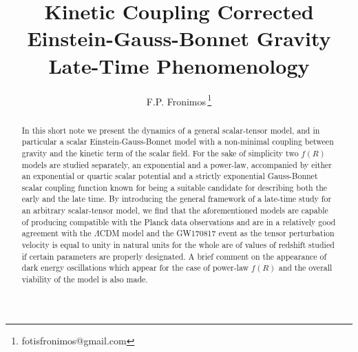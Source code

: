\documentclass[aps,prd,twocolumn,groupedaddress,showpacs,nofootinbib,amssymb]{revtex4-2}
\begin{document}

\title{Kinetic Coupling Corrected Einstein-Gauss-Bonnet Gravity Late-Time Phenomenology}
\author{F.P.
Fronimos\,\thanks{fotisfronimos@gmail.com}}


\begin{abstract}
In this short note we present the dynamics of a general scalar-tensor model, and in particular a scalar Einstein-Gauss-Bonnet model with a non-minimal coupling between gravity and the kinetic term of the scalar field. For the sake of simplicity two $f(R)$ models are studied separately, an exponential and a power-law, accompanied by either an exponential or quartic scalar potential and a strictly exponential Gauss-Bonnet scalar coupling function known for being a suitable candidate for describing both the early and the late time. By introducing the general framework of a late-time study for an arbitrary scalar-tensor model, we find that the aforementioned models are capable of producing compatible with the Planck data observations and are in a relatively good agreement with the $\Lambda$CDM model and the GW170817 event as the tensor perturbation velocity is equal to unity in natural units for the whole are of values of redshift studied if certain parameters are properly designated. A brief comment on the appearance of dark energy oscillations which appear for the case of power-law $f(R)$ and the overall viability of the model is also made. 
\end{abstract}


\maketitle
\end{document}
